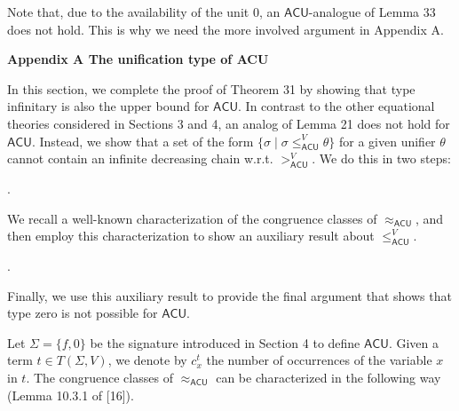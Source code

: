 Note that, due to the availability of the unit $0$, an $\mathsf{ACU}$-analogue of Lemma 33 does not hold. This is why we need the more involved argument in Appendix A.\par
 
 
 


 
\par\medskip\noindent\textbf{Appendix A The unification type of ACU}\par
 
 
In this section, we complete the proof of Theorem 31 by showing that type infinitary is also the upper bound for $\mathsf{ACU}$. In contrast to the other equational theories considered in Sections 3 and 4, an analog of Lemma 21 does not hold for $\mathsf{ACU}$. Instead, we show that a set of the form $\{\sigma\mid\sigma\leq_{\mathsf{ACU}}^{V}\theta\}$ for a given unifier $\theta$ cannot contain an infinite decreasing chain w.r.t. $>_{\mathsf{ACU}}^{V}$. We do this in two steps:\par
  
\par{}. 
 
We recall a well-known characterization of the congruence classes of $\approx_{\mathsf{ACU}}$, and then employ this characterization to show an auxiliary result about $\leq_{\mathsf{ACU}}^{V}$.\par
 
 
 
\par{}. 
 
Finally, we use this auxiliary result to provide the final argument that shows that type zero is not possible for $\mathsf{ACU}$.\par
 
 
  
 
 
Let $\Sigma=\{f,0\}$ be the signature introduced in Section 4 to define $\mathsf{ACU}$. Given a term $t\in T(\Sigma,V)$, we denote by $c^{t}_{x}$ the number of occurrences of the variable $x$ in $t$. The congruence classes of $\approx_{\mathsf{ACU}}$ can be characterized in the following way (Lemma 10.3.1 of [16]).\par
 
